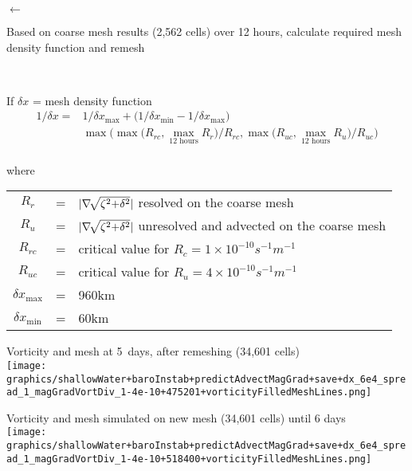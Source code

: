 {\begin{center}
\vspace{6pt}
{\Huge$\longleftarrow$}
\begin{minipage}[b]{0.79\linewidth}\raggedright
Based on coarse mesh results (2,562 cells) over 12 hours, calculate required mesh density function and remesh
\end{minipage}\\
\begin{raggedright}
If $\delta x$ = mesh density function
\vspace{-6pt}
\begin{equation*}\begin{split}
1/\delta x =& 1/\delta x_{\max}
+ \bigl(1/\delta x_{\min} - 1/\delta x_{\max}\bigr)\\
&\max
\biggl(
    \max\bigl( R_{rc},\underset{12\text{ hours}}{\max}R_r\bigr) \big/ R_{rc},
    \max\bigl( R_{uc},\underset{12\text{ hours}}{\max}R_u\bigr) \big/ R_{uc}
\biggr)\\
\end{split}\end{equation*}\vfill
{
\setlength{\tabcolsep}{1pt}
\vspace{-6pt}where \begin{tabular}[t]{ccl}
$R_r$ & = & $|\nabla\negthinspace\sqrt{\zeta^2\negmedspace + \negmedspace \delta^2}|$ resolved on the coarse mesh \\
$R_u$ & = & $|\nabla\negthinspace\sqrt{\zeta^2\negmedspace + \negmedspace \delta^2}|$ unresolved and advected on the coarse mesh \\
$R_{rc}$ & = & critical value for $R_c = 1\times 10^{-10}s^{-1}m^{-1}$\\
$R_{uc}$ & = & critical value for $R_u = 4\times 10^{-10}s^{-1}m^{-1}$\\
$\delta x_{\max}$ & = & 960km \\
$\delta x_{\min}$ & = & 60km \\
\end{tabular}
}
\end{raggedright}



Vorticity and mesh at 5\half\ days, after remeshing (34,601 cells) \\
\texttt{[image: graphics/shallowWater+baroInstab+predictAdvectMagGrad+save+dx\_6e4\_spread\_1\_magGradVortDiv\_1-4e-10+475201+vorticityFilledMeshLines.png]}

Vorticity and mesh simulated on new mesh (34,601 cells) until 6 days \\
\texttt{[image: graphics/shallowWater+baroInstab+predictAdvectMagGrad+save+dx\_6e4\_spread\_1\_magGradVortDiv\_1-4e-10+518400+vorticityFilledMeshLines.png]}

\end{center}

}